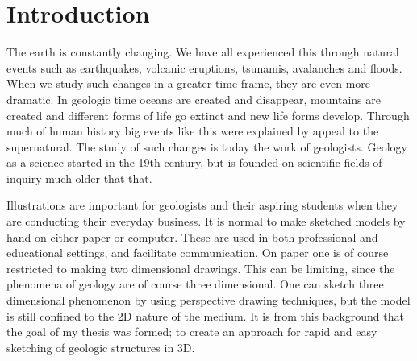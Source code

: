 \documentclass[a4paper,12pt]{report}
\begin{document}
\clearpage

\tableofcontents 



\clearpage


\chapter{Introduction}
\label{sec:intro}


% 
% 	
% 	
	

The earth is constantly changing. We have all experienced this through natural events such as earthquakes, volcanic eruptions, tsunamis, avalanches and floods. When we study such changes in a greater time frame, they are even more dramatic. In geologic time oceans are created and disappear, mountains are created and different forms of life go extinct and new life forms develop. Through much of human history big events like this were explained by appeal to the supernatural. The study of such changes is today the work of geologists. Geology as a science started in the 19th century, but is founded on scientific fields of inquiry much older that that.

Illustrations are important for geologists and their aspiring students when they are conducting their everyday business. It is normal to make sketched models by hand on either paper or computer. These are used in both professional and educational settings, and facilitate communication. On paper one is of course restricted to making two dimensional drawings. This can be limiting, since the phenomena of geology are of course three dimensional. One can sketch three dimensional phenomenon by using perspective drawing techniques, but the model is still confined to the 2D nature of the medium. It is from this background that the goal of my thesis was formed; to create an approach for rapid and easy sketching of geologic structures in 3D.
\end{document}
